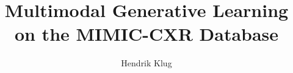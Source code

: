 \documentclass[english]{article}
\title{Multimodal Generative Learning on the MIMIC-CXR Database}
\author{Hendrik Klug}
\date{}
\begin{document}
\maketitle
\noindent








\end{document}
